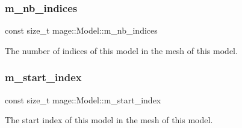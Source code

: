 \subsubsection{\texorpdfstring{m\+\_\+nb\+\_\+indices}{m\_nb\_indices}}
{\footnotesize\ttfamily const size\+\_\+t mage\+::\+Model\+::m\+\_\+nb\+\_\+indices\hspace{0.3cm}{\ttfamily [private]}}

The number of indices of this model in the mesh of this model. \hypertarget{classmage_1_1_model_a63a3e697c9eb1606249de15cc7b818c3}{}\label{classmage_1_1_model_a63a3e697c9eb1606249de15cc7b818c3} 
\subsubsection{\texorpdfstring{m\+\_\+start\+\_\+index}{m\_start\_index}}
{\footnotesize\ttfamily const size\+\_\+t mage\+::\+Model\+::m\+\_\+start\+\_\+index\hspace{0.3cm}{\ttfamily [private]}}

The start index of this model in the mesh of this model. 